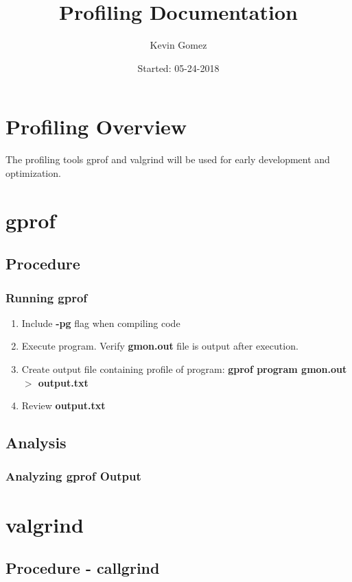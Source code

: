 \documentclass{article}
\title{Profiling Documentation}
\date{Started: 05-24-2018}
\author{Kevin Gomez}
\begin{document}
	
	\maketitle
	\newpage
	
	\section{Profiling Overview}
	The profiling tools gprof and valgrind will be used for early development and optimization.
	
	\section{gprof}
		\subsection{Procedure}
			\subsubsection{Running gprof}
				\begin{enumerate}
					\item Include \textbf{-pg} flag when compiling code
					\item Execute program. Verify \textbf{gmon.out} file is output after execution.
					\item Create output file containing profile of program: \newline 
					\textbf{gprof program gmon.out $>$ output.txt}
					\item Review \textbf{output.txt}
				\end{enumerate}
		\subsection{Analysis}
			\subsubsection{Analyzing gprof Output}

	\section{valgrind}
		\subsection{Procedure - callgrind}
\end{document}
